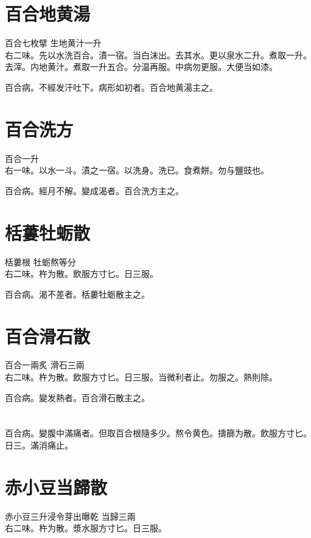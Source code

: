 \section{百合地黄湯}

百合{\scriptsize 七枚擘} 生地黄汁{\scriptsize 一升}\\
右二味。先以水洗百合。漬一宿。当白沫出。去其水。更以泉水二升。煮取一升。去滓。内地黄汁。煮取一升五合。分温再服。中病勿更服。大便当如漆。

百合病。不經发汗吐下。病形如初者。百合地黄湯主之。

\section{百合洗方}

百合{\scriptsize 一升}\\
右一味。以水一斗。漬之一宿。以洗身。洗已。食煮餅。勿与鹽豉也。

百合病。經月不解。變成渴者。百合洗方主之。

\section{栝蔞牡蛎散}

栝蔞根{ }牡蛎{\scriptsize 熬等分}\\
右二味。杵为散。飲服方寸匕。日三服。

百合病。渴不差者。栝蔞牡蛎散主之。

\section{百合滑石散}

百合{\scriptsize 一兩炙} 滑石{\scriptsize 三兩}\\
右二味。杵为散。飲服方寸匕。日三服。当微利者止。勿服之。熱則除。

百合病。變发熱者。百合滑石散主之。

\section{}

百合病。變腹中滿痛者。但取百合根隨多少。熬令黄色。擣篩为散。飲服方寸匕。日三。滿消痛止。

\section{赤小豆当歸散}

赤小豆{\scriptsize 三升浸令芽出曝乾} 当歸{\scriptsize 三兩}\\
右二味。杵为散。漿水服方寸匕。日三服。

